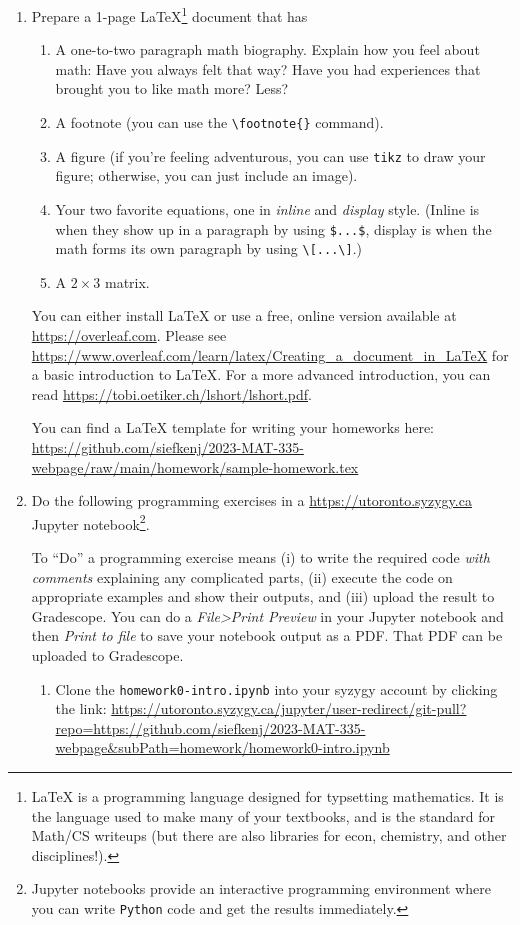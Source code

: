 \documentclass[letter]{article}
\begin{document}
	\begin{enumerate}
		\item Prepare a 1-page \LaTeX{}\footnote{ \LaTeX{} is a programming language designed for typsetting
			mathematics. It is the language used to make many of your textbooks, and is the standard for
			Math/CS writeups (but there are also libraries for econ, chemistry, and other disciplines!).} document that has
		\begin{enumerate}
			\item A one-to-two paragraph math biography. Explain how you feel about math: Have you always felt that way?
				Have you had experiences that brought you to like math more? Less?
			\item A footnote (you can use the \verb|\footnote{}| command).
			\item A figure (if you're feeling adventurous, you can use {\tt tikz} to draw your figure; otherwise,
				you can just include an image).
			\item Your two favorite equations, one in \emph{inline} and \emph{display} style. (Inline is when
				they show up in a paragraph by using \verb|$...$|, display is when the math forms
				its own paragraph by using \verb|\[...\]|.)
			\item A $2\times 3$ matrix.
		\end{enumerate}

		You can either install \LaTeX{} or use a free, online version available at \url{https://overleaf.com}. Please
		see \url{https://www.overleaf.com/learn/latex/Creating_a_document_in_LaTeX} for a basic introduction to \LaTeX{}.
		For a more advanced introduction, you can read \url{https://tobi.oetiker.ch/lshort/lshort.pdf}.

		You can find a \LaTeX{} template for writing your homeworks here: 
		\url{https://github.com/siefkenj/2023-MAT-335-webpage/raw/main/homework/sample-homework.tex}



		\item Do the following programming exercises in a \url{https://utoronto.syzygy.ca} Jupyter notebook\footnote{ Jupyter
			notebooks provide an interactive programming environment where you can write {\tt Python} code and get 
			the results immediately.}.

			To ``Do'' a programming exercise means (i) to write the required code \emph{with comments} explaining
			any complicated parts, (ii) execute the code on appropriate examples and show their outputs, and 
			(iii) upload the result to Gradescope. You can do a {\it File>Print Preview} in your Jupyter notebook
			and then {\it Print to file} to save your notebook output as a PDF. That PDF can be uploaded to Gradescope.
		\begin{enumerate}
			\item Clone the {\tt homework0-intro.ipynb} into your syzygy account by clicking the link:
				\url{https://utoronto.syzygy.ca/jupyter/user-redirect/git-pull?repo=https://github.com/siefkenj/2023-MAT-335-webpage&subPath=homework/homework0-intro.ipynb}


\end{enumerate}
\end{enumerate}
\end{document}
